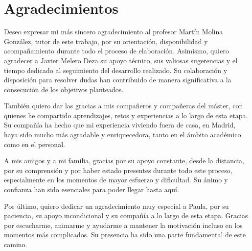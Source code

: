 \chapter*{Agradecimientos}

Deseo expresar mi más sincero agradecimiento al profesor Martín Molina González, 
tutor de este trabajo, por su orientación, disponibilidad y acompañamiento durante 
todo el proceso de elaboración. Asimismo, quiero agradecer a Javier Melero Deza su apoyo técnico, sus valiosas 
sugerencias y el tiempo dedicado al seguimiento del desarrollo realizado. 
Su colaboración y disposición para resolver dudas han contribuido de manera 
significativa a la consecución de los objetivos planteados.

También quiero dar las gracias a mis compañeros y compañeras del máster,
 con quienes he compartido aprendizajes, retos y experiencias a lo largo 
 de esta etapa. Su compañía ha hecho que mi experiencia viviendo fuera de casa, 
 en Madrid, haya sido mucho más agradable y enriquecedora, 
 tanto en el ámbito académico como en el personal.

A mis amigos y a mi familia, gracias por su apoyo constante, desde la distancia,
por su comprensión y por haber estado presentes durante todo este proceso, 
especialmente en los momentos de mayor esfuerzo y dificultad. 
Su ánimo y confianza han sido esenciales para poder llegar hasta aquí.

Por último, quiero dedicar un agradecimiento muy especial a Paula, por su paciencia, 
su apoyo incondicional y su compañía a lo largo de esta etapa.
 Gracias por escucharme, animarme y ayudarme a mantener la motivación
  incluso en los momentos más complicados. Su presencia ha sido una parte fundamental de este camino.
